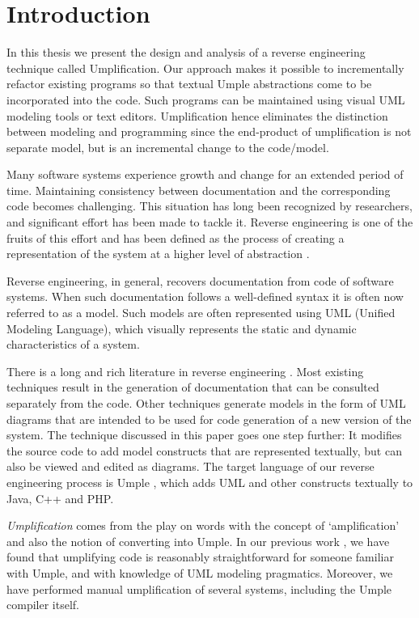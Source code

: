 \chapter{Introduction}

In this thesis we present the design and analysis of a reverse engineering technique called Umplification. Our approach makes it possible to incrementally refactor existing programs so that textual Umple abstractions come to be incorporated into the code. Such programs can be maintained using visual UML modeling tools or text editors.  Umplification hence eliminates the distinction between modeling and programming since the end-product of umplification is not separate model, but is an incremental change to the code/model. 

Many software systems experience growth and change for an extended period of time. Maintaining consistency between documentation and the corresponding code becomes challenging. This situation has long been recognized by researchers, and significant effort has been made to tackle it. Reverse engineering is one of the fruits of this effort and has been defined as the process of creating a representation of the system at a higher level of abstraction \cite{Chikofsky}.

Reverse engineering, in general, recovers documentation from code of software systems. When such documentation follows a well-defined syntax it is often now referred to as a model.  Such models are often represented using UML (Unified Modeling Language), which visually represents the static and dynamic characteristics of a system. 

There is a long and rich literature in reverse engineering \cite{CanforaHarman2007}. Most existing techniques result in the generation of documentation that can be consulted separately from the code. Other techniques generate models in the form of UML diagrams that are intended to be used for code generation of a new version of the system. The technique discussed in this paper goes one step further: It modifies the source code to add model constructs that are represented textually, but can also be viewed and edited as diagrams. The target language of our reverse engineering process is Umple \cite{UmpleMAIN}, which adds UML and other constructs textually to Java, C++ and PHP.

\textit{Umplification} comes from the play on words with the concept of `amplification' and also the notion of converting into Umple. In our previous work \cite{Lethbridge2010c}, we have found that umplifying code is reasonably straightforward for someone familiar with Umple, and with knowledge of UML modeling pragmatics. Moreover, we have performed manual umplification of several systems, including the Umple compiler itself.

